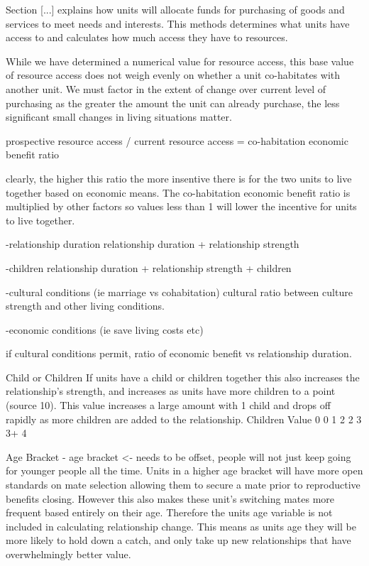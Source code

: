 Section [...] explains how units will allocate funds for purchasing of goods and services to meet needs and interests. This methods determines what units have access to and calculates how much access they have to resources. 



While we have determined a numerical value for resource access, this base value of resource access does not weigh evenly on whether a unit co-habitates with another unit. We must factor in the extent of change over current level of purchasing as the greater the amount the unit can already purchase, the less significant small changes in living situations matter.

prospective resource access / current resource access = co-habitation economic benefit ratio

clearly, the higher this ratio the more insentive there is for the two units to live together based on economic means. The co-habitation economic benefit ratio is multiplied by other factors so values less than 1 will lower the incentive for units to live together.






-relationship duration
relationship duration + relationship strength

-children
relationship duration + relationship strength + children

-cultural conditions (ie marriage vs cohabitation)
cultural ratio between culture strength and other living conditions.

-economic conditions (ie save living costs etc)

if cultural conditions permit, ratio of economic benefit vs relationship duration.

 
Child or Children
If units have a child or children together this also increases the relationship's strength, and increases as units have more children to a point (source 10). This value increases a large amount with 1 child and drops off rapidly as more children are added to the relationship. 
Children	Value 
 0		0	
 1		2
 2		3
 3+		4
		



Age Bracket
- age bracket <- needs to be offset, people will not just keep going for younger people all the time.
Units in a higher age bracket will have more open standards on mate selection allowing them to secure a mate prior to reproductive benefits closing. However this also makes these unit's switching mates more frequent based entirely on their age. Therefore the units age variable is not included in calculating relationship change. This means as units age they will be more likely to hold down a catch, and only take up new relationships that have overwhelmingly better value. 


